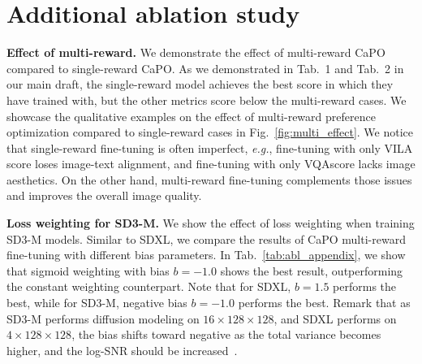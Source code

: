 \section{Additional ablation study}\label{appendix:impl}

\vspace{0.05in}
\noindent
{\bf Effect of multi-reward.}
We demonstrate the effect of multi-reward CaPO compared to single-reward CaPO. As we demonstrated in Tab.~1 and Tab.~2 in our main draft, the single-reward model achieves the best score in which they have trained with, but the other metrics score below the multi-reward cases. We showcase the qualitative examples on the effect of multi-reward preference optimization compared to single-reward cases in Fig.~\ref{fig:multi_effect}. We notice that single-reward fine-tuning is often imperfect, \emph{e.g.}, fine-tuning with only VILA score loses image-text alignment, and fine-tuning with only VQAscore lacks image aesthetics. On the other hand, multi-reward fine-tuning complements those issues and improves the overall image quality.



\vspace{0.05in}
\noindent
{\bf Loss weighting for SD3-M.}
We show the effect of loss weighting when training SD3-M models. Similar to SDXL, we compare the results of CaPO multi-reward fine-tuning with different bias parameters. In Tab.~\ref{tab:abl_appendix}, we show that sigmoid weighting with bias $b=-1.0$ shows the best result, outperforming the constant weighting counterpart. Note that for SDXL, $b=1.5$ performs the best, while for SD3-M, negative bias $b=-1.0$ performs the best. Remark that as SD3-M performs diffusion modeling on $16\times 128 \times 128$, and SDXL performs on $4\times 128\times 128$, the bias shifts toward negative as the total variance becomes higher, and the log-SNR should be increased~\citep{hoogeboom2023simple, hoogeboom2024simpler}.


